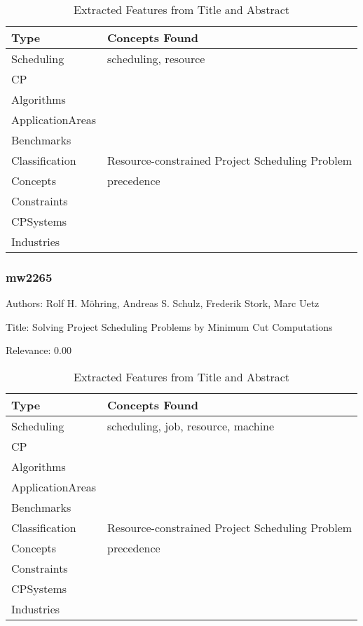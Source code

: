 {\scriptsize
\begin{longtable}{p{2cm}p{20cm}}
\caption{Extracted Features from Title and Abstract}\\ \toprule
Type & Concepts Found\\ \midrule
\endhead
\bottomrule
\endfoot
Scheduling & scheduling, resource\\ 
CP & \\ 
Algorithms & \\ 
ApplicationAreas & \\ 
Benchmarks & \\ 
Classification & Resource-constrained Project Scheduling Problem\\ 
Concepts & precedence\\ 
Constraints & \\ 
CPSystems & \\ 
Industries & \\ 
\end{longtable}
}



\subsubsection{mw2265}
\label{mw:mw2265}

Authors: Rolf H. Möhring, Andreas S. Schulz, Frederik Stork, Marc Uetz

Title: Solving Project Scheduling Problems by Minimum Cut Computations

Relevance:  0.00

{\scriptsize
\begin{longtable}{p{2cm}p{20cm}}
\caption{Extracted Features from Title and Abstract}\\ \toprule
Type & Concepts Found\\ \midrule
\endhead
\bottomrule
\endfoot
Scheduling & scheduling, job, resource, machine\\ 
CP & \\ 
Algorithms & \\ 
ApplicationAreas & \\ 
Benchmarks & \\ 
Classification & Resource-constrained Project Scheduling Problem\\ 
Concepts & precedence\\ 
Constraints & \\ 
CPSystems & \\ 
Industries & \\ 
\end{longtable}
}

